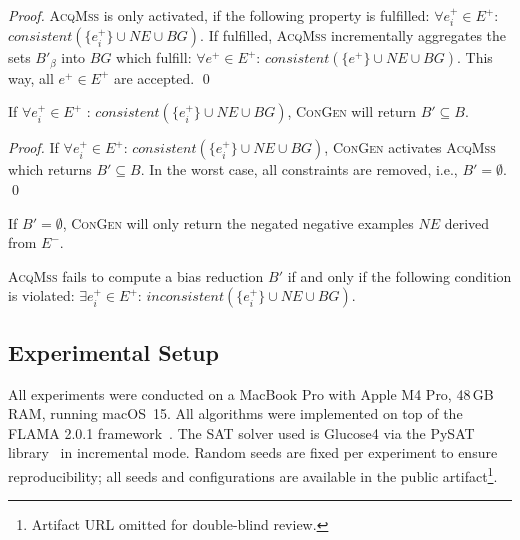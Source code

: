 \begin{proof}
\textsc{AcqMss} is only activated, if the following property is fulfilled: $\forall e^{+}_i \in E^{+}$:
$consistent(\{e^{+}_i\} \cup NE \cup BG)$. If fulfilled, \textsc{AcqMss} incrementally aggregates the sets $B'_{\beta}$ into $BG$
which fulfill: $\forall e^+ \in E^+$: $consistent(\{e^+\} \cup NE \cup BG)$. This way, all $e^+ \in E^+$ are accepted. \qed
\end{proof}

\begin{theorem}
\label{thm:completeness}
If $\forall e^+_i \in E^+$ : $consistent(\{e^+_i\} \cup NE \cup BG)$,
\textsc{ConGen} will return $B' \subseteq B$.
\end{theorem}

\begin{proof}
If $\forall e^+_i \in E^+$: $consistent(\{e^+_i\} \cup NE \cup BG)$, \textsc{ConGen} activates \textsc{AcqMss} which
returns $B' \subseteq B$. In the worst case, all constraints are removed, i.e., $B' = \emptyset$. \qed
\end{proof}

\begin{remark}
If $B' = \emptyset$, \textsc{ConGen} will only return the negated negative examples $NE$ derived from $E^-$.
\end{remark}

\begin{corollary}
\textsc{AcqMss} fails to compute a bias reduction $B'$ if and only if the following
condition is violated: $\exists e^+_i \in E^+$: $inconsistent(\{e^+_i\} \cup NE \cup BG)$.
\end{corollary}

\subsection{Experimental Setup}
\label{sec:experimental_setup}

All experiments were conducted on a MacBook Pro with Apple M4 Pro, 48\,GB RAM, running macOS~15. All algorithms were implemented on top of the FLAMA 2.0.1 framework~\cite{Galindo2023flama}. The SAT solver used is Glucose4 via the PySAT library~\cite{imms-sat18} in incremental mode. Random seeds are fixed per experiment to ensure reproducibility; all seeds and configurations are available in the public artifact\footnote{Artifact URL omitted for double-blind review.}.

